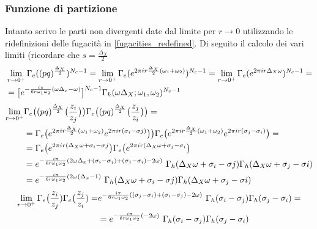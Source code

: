 \documentclass[a4paper,12pt]{report}
\begin{document}
\subsubsection{Funzione di partizione}
Intanto scrivo le parti non divergenti date dal limite per $ r \rightarrow 0$ utilizzando le ridefinizioni delle fugacità in \ref{fugacities_redefined}. Di seguito il calcolo dei vari limiti (ricordare che $ s = \frac{\Delta_X}{2}$
\begin{align*}
&\lim_{r \rightarrow 0^+} \Gamma_e((pq)^{\frac{\Delta_X}{2}})^{N_c -1} =
\lim_{r \rightarrow 0^+ } \Gamma_e( e^{2 \pi i r  {\Delta_X \over 2} (\omega_1 + \omega_2)})^{N_c-1} = \lim_{r \rightarrow 0^+ } \Gamma_e( e^{2 \pi i r  \Delta_X \omega })^{N_c-1} = \\
&=\big[ e^{- \frac{i \pi} {6 r \omega_1 \omega_2 }  ( \omega \Delta_x - \omega) }\big]^{N_c-1} \Gamma_h ( \omega \Delta_X ; \omega_1, \omega_2)^{N_c-1}
\end{align*}
 \begin{align*}
\lim_{r \rightarrow 0^+} & \Gamma_e\big( (pq)^{\frac{\Delta_X}{2}} \big( { z_i \over z_j} \big) \big) \Gamma_e \big( (pq)^{\frac{\Delta_X}{2}} \big( { z_j \over z_i} \big) \big) = \\
&= \Gamma_e\big( e^{2 \pi i r \frac{\Delta_X}{2} (\omega_1 + \omega_2)} e^{ 2 \pi  i r (\sigma_i - \sigma j)} \big) \big) \Gamma_e \big( e^{ 2 \pi i r \frac{\Delta_X}{2} (\omega_1 + \omega_2)}  e^{ 2 \pi i r (\sigma_j - \sigma_i)} \big) =  \\
&= \Gamma_e\big( e^{2 \pi  i r (\Delta_X \omega +\sigma_i - \sigma j} \big) \Gamma_e \big(  e^{2 \pi  i r (\Delta_X \omega +\sigma_j - \sigma_i} \big) \\
 & = e^{- \frac{i \pi} {6 r \omega_1 \omega_2 }  ( 2 \omega \Delta_x + (\sigma_i - \sigma_j)+(\sigma_j - \sigma_i) - 2 \omega) }\, \, \Gamma_h ( \Delta_X \omega + \sigma_i - \sigma j ) \Gamma_h ( \Delta_X \omega + \sigma_j - \sigma i) \\
 & = e^{- \frac{i \pi} {6 r \omega_1 \omega_2 }  ( 2 \omega (\Delta_x - 1) }\, \, \Gamma_h ( \Delta_X \omega + \sigma_i - \sigma j ) \Gamma_h ( \Delta_X \omega + \sigma_j - \sigma i) 
\end{align*}
\begin{align*}
 \lim_{r \rightarrow 0^+ } \Gamma_e\big( {z_i \over z_j})\Gamma_e\big( {z_j \over z_i}) = &e^{- \frac{i \pi} {6 r \omega_1 \omega_2 }  ( (\sigma_j - \sigma_i) + (\sigma_i- \sigma_j) - 2 \omega)} \, \, \Gamma_h (  \sigma_i - \sigma_j) \Gamma_h (  \sigma_j - \sigma_i) =\\
& = e^{- \frac{i \pi} {6 r \omega_1 \omega_2 }  ( - 2 \omega)}  \, \, \Gamma_h (  \sigma_i - \sigma_j) \Gamma_h (  \sigma_j - \sigma_i)
\end{align*}
\end{document}
